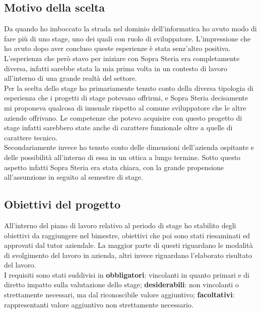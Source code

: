 \subsection{Motivo della scelta}

Da quando ho imboccato la strada nel dominio dell'informatica ho avuto modo di fare più di uno stage, uno dei quali con ruolo di sviluppatore. L'impressione che ho avuto dopo aver concluso queste esperienze è stata senz'altro positiva. L'esperienza che però stavo per iniziare con Sopra Steria era completamente diversa, infatti sarebbe stata la mia prima volta in un contesto di lavoro all'interno di una grande realtà del settore.\\

Per la scelta dello stage ho primariamente tenuto conto della diversa tipologia di esperienza che i progetti di stage potevano offrirmi, e Sopra Steria decisamente mi proponeva qualcosa di inusuale rispetto al comune sviluppatore che le altre aziende offrivano. Le competenze che potevo acquisire con questo progetto di stage infatti sarebbero state anche di carattere funzionale oltre a quelle di carattere tecnico.\\

Secondariamente invece ho tenuto conto delle dimensioni dell'azienda ospitante e delle possibilità all'interno di essa in un ottica a lungo termine. Sotto questo aspetto infatti Sopra Steria era stata chiara, con la grande propensione all'assunzione in seguito al semestre di stage.

\subsection{Obiettivi del progetto}
All'interno del piano di lavoro relativo al periodo di stage ho stabilito degli obiettivi da raggiungere nel bimestre, obiettivi che poi sono stati riesaminati ed approvati dal tutor aziendale. La maggior parte di questi riguardano le modalità di svolgimento del lavoro in azienda, altri invece riguardano l'elaborato risultato del lavoro.\\

I requisiti sono stati suddivisi in \textbf{obbligatori}: vincolanti in quanto primari e di diretto impatto sulla valutazione dello stage; \textbf{desiderabili}: non vincolanti o strettamente necessari, ma dal riconoscibile valore aggiuntivo; \textbf{facoltativi}: rappresentanti valore aggiuntivo non strettamente necessario.

